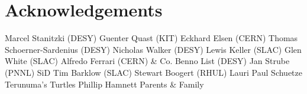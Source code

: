 \chapter*{Acknowledgements}
Marcel Stanitzki (DESY)
Guenter Quast (KIT)
Eckhard Elsen (CERN)
Thomas Schoerner-Sardenius (DESY)
Nicholas Walker (DESY)
Lewis Keller (SLAC)
Glen White (SLAC)
Alfredo Ferrari (CERN) \& Co.
Benno List (DESY)
Jan Strube (PNNL)
SiD
Tim Barklow (SLAC)
Stewart Boogert (RHUL)
Lauri 
Paul Schuetze
Terunuma's Turtles
Phillip Hamnett
Parents \& Family
